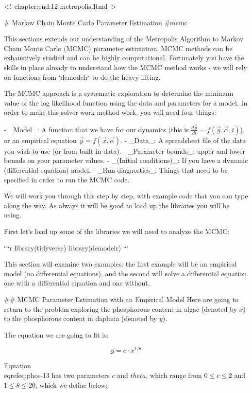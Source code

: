 \documentclass[
]{book}
\theoremstyle{definition}
\theoremstyle{definition}
\theoremstyle{definition}
\theoremstyle{remark}
\begin{document}
<!--chapter:end:12-metropolis.Rmd-->

# Markov Chain Monte Carlo Parameter Estimation {#mcmc}

This sections extends our understanding of the Metropolis Algorithm to Markov Chain Monte Carlo (MCMC) parameter estimation.  MCMC methods can be exhaustively studied and can be highly computational.  Fortunately you have the skills in place already to understand how the MCMC method works - we will rely on functions from `demodelr` to do the heavy lifting.

The MCMC approach is a systematic exploration to determine the minimum value of the log likelihood function using the data and parameters for a model.  In order to make this solver work method work, you will need four things:

- _Model_: A function that we have for our dynamics (this is $\displaystyle \frac{d\vec{y}}{dt} = f(\vec{y},\vec{\alpha},t)$), or an empirical equation $\vec{y}=f(\vec{x},\vec{\alpha})$.
- _Data_: A spreadsheet file of the data you wish to use (or from built in data).
- _Parameter bounds_: upper and lower bounds on your parameter values.
- _(Initial conditions)_: If you have a dynamic (differential equation) model.
- _Run diagnostics_: Things that need to be specified in order to run the MCMC code.

We will work you through this step by step, with example code that you can type along the way. As always it will be good to load up the libraries you will be using.  

First let's load up some of the libraries we will need to analyze the MCMC:

```r
library(tidyverse)
library(demodelr)
```


This section will examine two examples: the first example will be an empirical model (no differential equations), and the second will solve a differential equation. one with a differential equation and one without.

## MCMC Parameter Estimation with an Empirical Model
Here are going to return to the problem exploring the phosphorous content in algae (denoted by $x$) to the phosphorous content in daphnia (denoted by $y$).

The equation we are going to fit is:

\begin{equation}
y = c \cdot x^{1/\theta} \label{eq:phos-13}
\end{equation}

Equation \\eqref{eq:phos-13} has two parameters $c$ and $theta$, which range from $0 \leq c \leq 2$ and $1 \leq \theta \leq 20$, which we define below:
\end{document}
